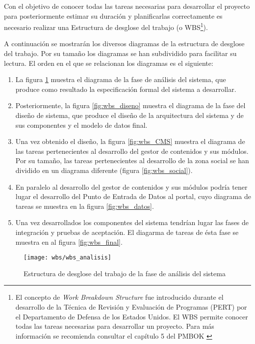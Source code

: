 Con el objetivo de conocer todas las tareas necesarias para desarrollar el proyecto para posteriormente estimar su duración y planificarlas correctamente es necesario realizar una Estructura de desglose del trabajo (o WBS\footnote{El concepto de \textit{Work Breakdown Structure} fue introducido durante el desarrollo de la Técnica de Revisión y Evaluación de Programas (PERT) por el Departamento de Defensa de los Estados Unidos.  El WBS permite conocer todas las tareas necesarias para desarrollar un proyecto.  Para más información se recomienda consultar el capítulo 5 del PMBOK \cite{pmi:pmbok}}).

A continuación se mostrarán los diversos diagramas de la estructura de desglose del trabajo.  Por su tamaño los diagramas se han subdividido para facilitar su lectura.  El orden en el que se relacionan los diagramas es el siguiente:
\begin{enumerate}
	\item
		La figura \ref{fig:wbs_analisis} muestra el diagrama de la fase de análisis del sistema, que produce como resultado la especificación formal del sistema a desarrollar.
	\item
		Posteriormente, la figura \ref{fig:wbs_diseno} muestra el diagrama de la fase del diseño de sistema, que produce el diseño de la arquitectura del sistema y de sus componentes y el modelo de datos final.
	\item
		Una vez obtenido el diseño, la figura \ref{fig:wbs_CMS} muestra el diagrama de las tareas pertenecientes al desarrollo del gestor de contenidos y sus módulos.  Por su tamaño, las tareas pertenecientes al desarrollo de la zona social se han dividido en un diagrama diferente (figura \ref{fig:wbs_social}).
	\item
		En paralelo al desarrollo del gestor de contenidos y sus módulos podría tener lugar el desarrollo del Punto de Entrada de Datos al portal, cuyo diagrama de tareas se muestra en la figura \ref{fig:wbs_datos}.
	\item
		Una vez desarrollados los componentes del sistema tendrían lugar las fases de integración y pruebas de aceptación.  El diagarma de tareas de ésta fase se muestra en al figura \ref{fig:wbs_final}.
\end{enumerate}

\begin{figure}[h]
	\centering
	\texttt{[image: wbs/wbs\_analisis]}
	\caption{Estructura de desglose del trabajo de la fase de análisis del sistema}
	\label{fig:wbs_analisis}
\end{figure}

